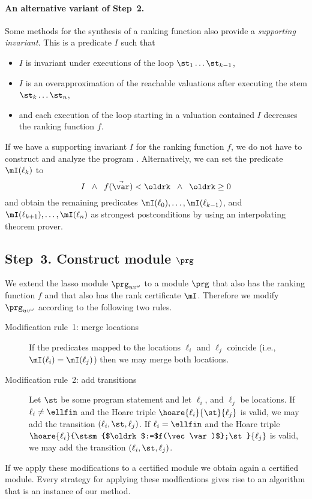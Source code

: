 \paragraph{An alternative variant of Step~2.}
Some methods for the synthesis of a ranking function \cite{cav/BradleyMS05,conf/atva/HeizmannHLP13} also provide a \emph{supporting invariant}. This is a predicate $I$ such that
\begin{itemize}
 \item $I$ is invariant under executions of the loop $\st_1\dots\st_{k-1}$,
 \item $I$ is an overapproximation of the reachable valuations after executing the stem $\st_k\dots\st_{n}$,
 \item and each execution of the loop starting in a valuation contained $I$ decreases the ranking function $f$.
\end{itemize}
If we have a supporting invariant $I$ for the ranking function $f$, we do not have to construct and analyze the program \rankDecrease.
Alternatively, we can set the predicate $\mI(\ell_k)$ to 
$$I\;\;\land\;\; f(\vec\var)<\oldrk\;\;\land\;\; \oldrk\geq 0$$
and obtain the remaining predicates $\mI(\ell_0),\dots, \mI(\ell_{k-1})$, and $\mI(\ell_{k+1}),\dots,\mI(\ell_n)$ as strongest postconditions by using an interpolating theorem prover.









\subsection*{Step~3. Construct module $\prg$} 
We extend the lasso module $\prg_{uv^\omega}$ to a module $\prg$ that also has the ranking function $f$ and that also has the rank certificate $\mI$.
Therefore we modify $\prg_{uv^\omega}$ according to the following two rules.

\begin{description}

 \item[Modification rule~1: merge locations]
 If the predicates mapped to the locations $\ell_i$ and $\ell_j$ coincide (i.e., $ \mI(\ell_i) = \mI(\ell_j) $) then we may merge both locations.
\item[Modification rule~2: add transitions] Let $\st$ be some program statement and let $\ell_i$, and $\ell_j$ be locations.
 If $\ell_i \neq \ellfin$ and the Hoare triple $\hoare{\ell_i}{\st}{\ell_j}$ is valid, we may add the transition $(\ell_i,\st,\ell_j)$.
 If $\ell_i = \ellfin$ and the Hoare triple $\hoare{\ell_i}{\stsm{$\oldrk$:=$f(\vec\var)$};\st}{\ell_j}$ is valid, we may add the transition $(\ell_i,\st,\ell_j)$.
\end{description}
If we apply these modifications to a certified module we obtain again a certified module.
Every strategy for applying these modfications gives rise to an algorithm that is an instance of our method.





